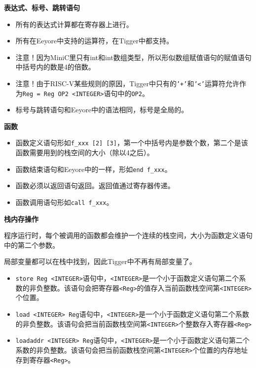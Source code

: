 \noindent \textbf{表达式、标号、跳转语句}
\begin{itemize}
\item
所有的表达式计算都在寄存器上进行。

\item
所有在Eeyore中支持的运算符，在Tigger中都支持。

\item
注意！因为MiniC里只有int和int数组类型，所以形似数组赋值语句的赋值语句中括号内的数是4的倍数。

\item
注意！由于RISC-V某些规则的原因，Tigger中只有的\texttt{'+'}和\texttt{'<'}运算符允许作为\texttt{Reg = Reg OP2 <INTEGER>}语句中的\texttt{OP2}。

\item
标号与跳转语句和Eeyore中的语法相同，标号是全局的。
\end{itemize}
\textbf{函数}
\begin{itemize}
\item
函数定义语句形如\texttt{f\_xxx [2] [3]}，第一个中括号内是参数个数，第二个是该函数需要用到的栈空间的大小（除以4之后）。

\item
函数结束语句和Eeyore中的一样，形如\texttt{end f\_xxx}。

\item
函数必须以返回语句返回。返回值通过寄存器传递。

\item
函数调用语句形如\texttt{call f\_xxx}。
\end{itemize}
\textbf{栈内存操作}

程序运行时，每个被调用的函数都会维护一个连续的栈空间，大小为函数定义语句中的第二个参数。

局部变量都可以在栈中找到，因此Tigger中不再有局部变量了。

\begin{itemize}
\item
\texttt{store Reg <INTEGER>}语句中，\texttt{<INTEGER>}是一个小于函数定义语句第二个系数的非负整数。该语句会把寄存器\texttt{<Reg>}的值存入当前函数栈空间第\texttt{<INTEGER>}个位置。

\item
\texttt{load <INTEGER> Reg}语句中，\texttt{<INTEGER>}是一个小于函数定义语句第二个系数的非负整数。该语句会把当前函数栈空间第\texttt{<INTEGER>}个整数存入寄存器\texttt{<Reg>}

\item
\texttt{loadaddr <INTEGER> Reg}语句中，\texttt{<INTEGER>}是一个小于函数定义语句第二个系数的非负整数。该语句会把当前函数栈空间第\texttt{<INTEGER>}个位置的内存地址存到寄存器\texttt{<Reg>}。
\end{itemize}

